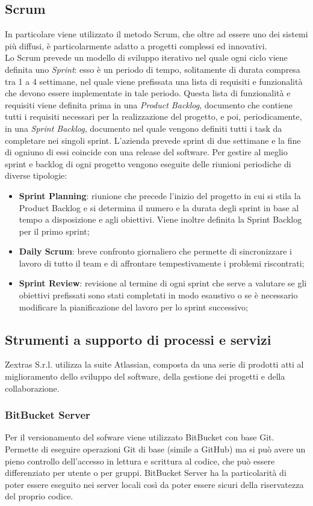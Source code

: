 \subsection{Scrum}
In particolare  viene utilizzato il metodo Scrum, che oltre ad essere uno dei sistemi più diffusi, è particolarmente adatto a progetti complessi ed innovativi.\\
Lo Scrum prevede un modello di sviluppo iterativo nel quale ogni ciclo viene definita uno \emph{Sprint}: esso è un periodo di tempo, solitamente di durata compresa tra 1 a 4 settimane, nel quale viene prefissata una lista di requisiti e funzionalità che devono essere implementate in tale periodo.
Questa lista di funzionalità e requisiti viene definita prima in una \emph{Product Backlog}, documento che contiene tutti i requisiti necessari per la realizzazione del progetto, e poi, periodicamente, in una \emph{Sprint Backlog}, documento nel quale vengono definiti tutti i task da completare nei singoli sprint.
L'azienda prevede sprint di due settimane e la fine di ogniuno di essi coincide con una release del software.
Per gestire al meglio sprint e backlog di ogni progetto vengono eseguite delle riunioni periodiche di diverse tipologie:
\begin{itemize}
	\item \textbf{Sprint Planning}: riunione che precede l'inizio del progetto in cui si stila la Product Backlog e si determina il numero e la durata degli sprint in base al tempo a disposizione e agli obiettivi. Viene inoltre definita la Sprint Backlog per il primo sprint;
	\item \textbf{Daily Scrum}: breve confronto giornaliero che permette di sincronizzare i lavoro di tutto il team e di affrontare tempestivamente i problemi riscontrati;
	\item \textbf{Sprint Review}: revisione al termine di ogni sprint che serve a valutare se gli obiettivi prefissati sono stati completati in modo esaustivo o se è necessario modificare la pianificazione del lavoro per lo sprint successivo;
\end{itemize}

\subsection{Strumenti a supporto di processi e servizi}
Zextras S.r.l. utilizza la suite Atlassian, composta da una serie di prodotti atti al miglioramento dello sviluppo del software, della gestione dei progetti e della collaborazione. 
\subsubsection{BitBucket Server}
Per il versionamento del sofware viene utilizzato BitBucket con base Git. Permette  di eseguire operazioni Git di base (simile a GitHub) ma si può avere un pieno controllo dell'accesso in lettura e scrittura al codice, che può essere differenziato per utente o per gruppi. BitBucket Server ha la particolarità di poter essere eseguito nei server locali così da poter essere sicuri della riservatezza del proprio codice.

